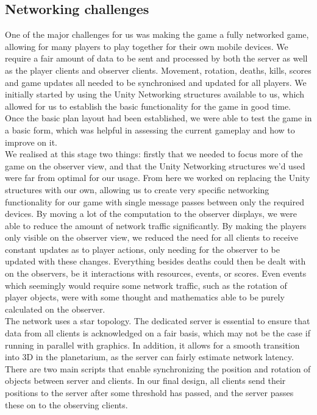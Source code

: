 \documentclass[11pt,a4paper]{article}
\begin{document}
 \subsection{Networking challenges}
  
  \noindent

  One of the major challenges for us was making the game a fully networked game, allowing for many players to play together for their own mobile devices. We require a fair amount of data to be sent and processed by both the server as well as the player clients and observer clients. Movement, rotation, deaths, kills, scores and game updates all needed to be synchronised and updated for all players. We initially started by using the Unity Networking structures available to us, which allowed for us to establish the basic functionality for the game in good time. Once the basic plan layout had been established, we were able to test the game in a basic form, which was helpful in assessing the current gameplay and how to improve on it. \\

  We realised at this stage two things: firstly that we needed to focus more of the game on the observer view, and that the Unity Networking structures we'd used were far from optimal for our usage. From here we worked on replacing the Unity structures with our own, allowing us to create very specific networking functionality for our game with single message passes between only the required devices. By moving a lot of the computation to the observer displays, we were able to reduce the amount of network traffic significantly. By making the players only visible on the observer view, we reduced the need for all clients to receive constant updates as to player actions, only needing for the observer to be updated with these changes. Everything besides deaths could then be dealt with on the observers, be it interactions with resources, events, or scores. Even events which seemingly would require some network traffic, such as the rotation of player objects, were with some thought and mathematics able to be purely calculated on the observer. \\

  The network uses a star topology. The dedicated server is essential to ensure that data from all clients is acknowledged on a fair basis, which may not be the case if running in parallel with graphics. In addition, it allows for a smooth transition into 3D in the planetarium, as the server can fairly estimate network latency. There are two main scripts that enable synchronizing the position and rotation of objects between server and clients. In our final design, all clients send their positions to the server after some threshold has passed, and the server passes these on to the observing clients. \\
\end{document}
